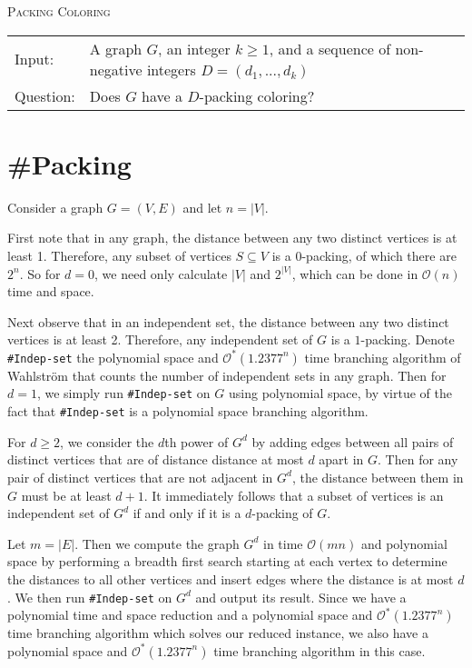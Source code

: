\documentclass[10pt, a4paper]{article}
\theoremstyle{definition}
\newcommand{\mcO}{\mathcal{O}}
\newcommand{\n}{\\}
\begin{document}
\begin{algorithm}[H]
\textsc{Packing Coloring\n}
\begin{tabular}{l l}
 Input:    & A graph $G$, an integer $k \geq 1$, and a sequence of non-negative integers $D = (d_1,...,d_k)$ \n
 Question: & Does $G$ have a $D$-packing coloring? \n
\end{tabular}	
\end{algorithm}

\clearpage

\section{\#\sc Packing}


Consider a graph $G = (V, E)$ and let $n = |V|$.

First note that in any graph, the distance between any two distinct vertices is at least 1. Therefore, any subset of vertices $S \subseteq V$ is a $0$-packing, of which there are $2^n$. So for $d=0$, we need only calculate $|V|$ and $2^{|V|}$, which can be done in $\mcO(n)$ time and space.

Next observe that in an independent set, the distance between any two distinct vertices is at least 2. Therefore, any independent set of $G$ is a $1$-packing. Denote \texttt{\#Indep-set} the polynomial space and $\mcO^*(1.2377^n)$ time branching algorithm of Wahlstr\"{o}m \cite{Dahllof2005,Wahlstr2008} that counts the number of independent sets in any graph. Then for $d=1$, we simply run \texttt{\#Indep-set} on $G$ using polynomial space, by virtue of the fact that \texttt{\#Indep-set} is a polynomial space branching algorithm.

For $d \geq 2$, we consider the $d$th power of $G^d$ by adding edges between all pairs of distinct vertices that are of distance distance at most $d$ apart in $G$. Then for any pair of distinct vertices that are not adjacent in $G^d$, the distance between them in $G$ must be at least $d+1$. It immediately follows that a subset of vertices is an independent set of $G^d$ if and only if it is a $d$-packing of $G$.

Let $m=|E|$. Then we compute the graph $G^d$ in time $\mcO(mn)$ and polynomial space by performing a breadth first search starting at each vertex to determine the distances to all other vertices and insert edges where the distance is at most $d$. We then run \texttt{\#Indep-set} on $G^d$ and output its result. Since we have a polynomial time and space reduction and a polynomial space and $\mcO^*(1.2377^n)$ time branching algorithm which solves our reduced instance, we also have a polynomial space and $\mcO^*(1.2377^n)$ time branching algorithm in this case.
\end{document}
